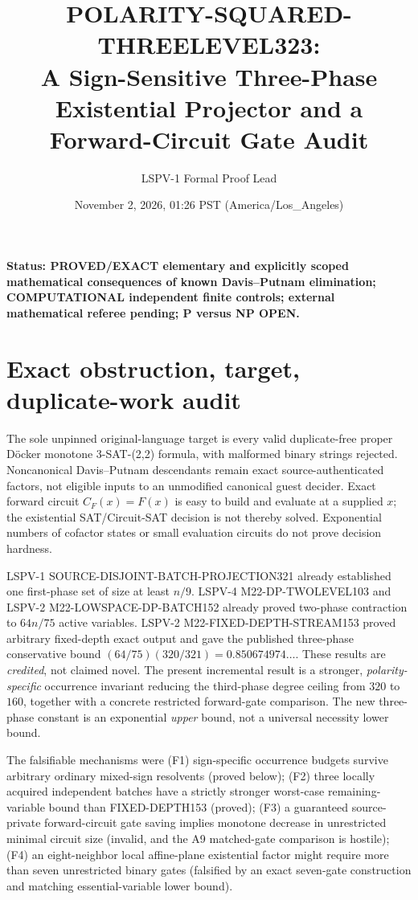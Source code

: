 \documentclass[11pt]{article}
\title{POLARITY-SQUARED-THREELEVEL323:\\A Sign-Sensitive Three-Phase Existential Projector and a Forward-Circuit Gate Audit}
\author{LSPV-1 Formal Proof Lead}
\date{November 2, 2026, 01:26 PST (America/Los\_Angeles)}
\begin{document}
\maketitle
\noindent\textbf{Status: PROVED/EXACT elementary and explicitly scoped mathematical consequences of known Davis--Putnam elimination; COMPUTATIONAL independent finite controls; external mathematical referee pending; P versus NP OPEN.}

\section{Exact obstruction, target, duplicate-work audit}
The sole unpinned original-language target is every valid duplicate-free proper D\"ocker monotone 3-SAT-(2,2) formula, with malformed binary strings rejected. Noncanonical Davis--Putnam descendants remain exact source-authenticated factors, not eligible inputs to an unmodified canonical guest decider. Exact forward circuit $C_F(x)=F(x)$ is easy to build and evaluate at a supplied $x$; the existential SAT/Circuit-SAT decision is not thereby solved. Exponential numbers of cofactor states or small evaluation circuits do not prove decision hardness.

LSPV-1 SOURCE-DISJOINT-BATCH-PROJECTION321 already established one first-phase set of size at least $n/9$. LSPV-4 M22-DP-TWOLEVEL103 and LSPV-2 M22-LOWSPACE-DP-BATCH152 already proved two-phase contraction to $64n/75$ active variables. LSPV-2 M22-FIXED-DEPTH-STREAM153 proved arbitrary fixed-depth exact output and gave the published three-phase conservative bound $(64/75)(320/321)=0.850674974\ldots$. These results are \emph{credited}, not claimed novel. The present incremental result is a stronger, \emph{polarity-specific} occurrence invariant reducing the third-phase degree ceiling from $320$ to $160$, together with a concrete restricted forward-gate comparison. The new three-phase constant is an exponential \emph{upper} bound, not a universal necessity lower bound.

The falsifiable mechanisms were (F1) sign-specific occurrence budgets survive arbitrary ordinary mixed-sign resolvents (proved below); (F2) three locally acquired independent batches have a strictly stronger worst-case remaining-variable bound than FIXED-DEPTH153 (proved); (F3) a guaranteed source-private forward-circuit gate saving implies monotone decrease in unrestricted minimal circuit size (invalid, and the A9 matched-gate comparison is hostile); (F4) an eight-neighbor local affine-plane existential factor might require more than seven unrestricted binary gates (falsified by an exact seven-gate construction and matching essential-variable lower bound).
\end{document}
